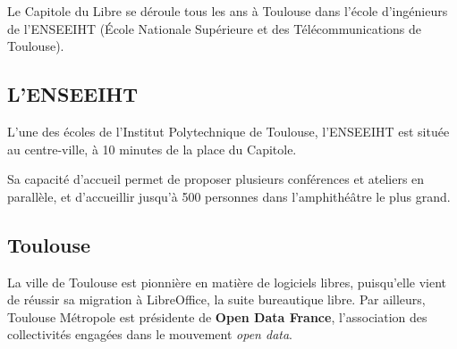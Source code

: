 
Le Capitole du Libre se déroule tous les ans à Toulouse dans l'école
 d'ingénieurs de l'ENSEEIHT (École Nationale Supérieure
 et des Télécommunications de Toulouse). 

\subsection{L'ENSEEIHT}

L'une des écoles de l'Institut Polytechnique de Toulouse, l'ENSEEIHT
 est située au centre-ville, à 10 minutes de la place du Capitole.

Sa capacité d'accueil permet de proposer plusieurs conférences et
 ateliers en parallèle, et d'accueillir jusqu'à 500 personnes dans
 l'amphithéâtre le plus grand.

\subsection{Toulouse}

La ville de Toulouse est pionnière en matière de logiciels libres,
 puisqu'elle vient de réussir sa migration à LibreOffice, la suite
 bureautique libre. Par ailleurs, Toulouse Métropole est présidente de
 \textbf{Open Data France}, l'association des collectivités
 engagées dans le mouvement \textit{open data}.


